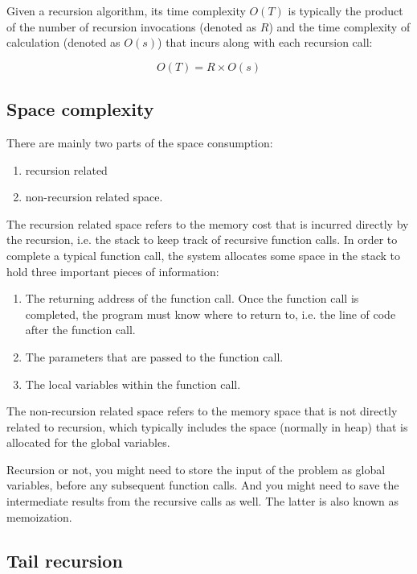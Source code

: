 Given a recursion algorithm, its time complexity $O(T)$ is typically the product of the number of recursion invocations (denoted as $R$) and the time complexity of calculation (denoted as $O(s)$) that incurs along with each recursion call:

\begin{equation}
  O(T) = R \times O(s)
\end{equation}

\subsection{Space complexity}
There are mainly two parts of the space consumption:
\begin{enumerate}
\item recursion related 
\item non-recursion related space.
\end{enumerate}


The recursion related space refers to the memory cost that is incurred directly by the recursion, i.e. the stack to keep track of recursive function calls.
In order to complete a typical function call, the system allocates some space in the stack to hold three important pieces of information:
\begin{enumerate}
\item The returning address of the function call. Once the function call is completed, the program must know where to return to, i.e. the line of code after the function call.
\item The parameters that are passed to the function call. 
\item The local variables within the function call.
\end{enumerate}



The non-recursion related space refers to the memory space that is not directly related to recursion, which typically includes the space (normally in heap) that is allocated for the global variables.


Recursion or not, you might need to store the input of the problem as global variables, before any subsequent function calls.
And you might need to save the intermediate results from the recursive calls as well.
The latter is also known as memoization.

 


\subsection{Tail recursion}

